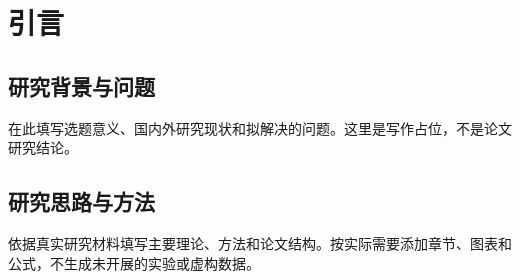 \chapter{引言}
\section{研究背景与问题}
在此填写选题意义、国内外研究现状和拟解决的问题。这里是写作占位，不是论文研究结论。

\section{研究思路与方法}
依据真实研究材料填写主要理论、方法和论文结构。按实际需要添加章节、图表和公式，不生成未开展的实验或虚构数据。


